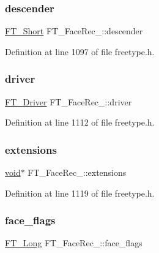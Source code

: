 \subsubsection{\texorpdfstring{descender}{descender}}
{\footnotesize\ttfamily \mbox{\hyperlink{fttypes_8h_aa7279be89046a2563cd3d4d6651fbdcf}{F\+T\+\_\+\+Short}} F\+T\+\_\+\+Face\+Rec\+\_\+\+::descender}



Definition at line 1097 of file freetype.\+h.

\mbox{\label{struct_f_t___face_rec___a011b62fcffdd6dc421c9ab3286d4c9fa}} 
\subsubsection{\texorpdfstring{driver}{driver}}
{\footnotesize\ttfamily \mbox{\hyperlink{freetype_8h_a5503c06c138ccdfeef486f2ce87bb8ec}{F\+T\+\_\+\+Driver}} F\+T\+\_\+\+Face\+Rec\+\_\+\+::driver}



Definition at line 1112 of file freetype.\+h.

\mbox{\label{struct_f_t___face_rec___a8b24f993e38da597d3e0273267890f49}} 
\subsubsection{\texorpdfstring{extensions}{extensions}}
{\footnotesize\ttfamily \mbox{\hyperlink{_s_d_l__opengles2__gl2ext_8h_ae5d8fa23ad07c48bb609509eae494c95}{void}}$\ast$ F\+T\+\_\+\+Face\+Rec\+\_\+\+::extensions}



Definition at line 1119 of file freetype.\+h.

\mbox{\label{struct_f_t___face_rec___af1596857ebc9f8eac4c4b51c8f3ffd31}} 
\subsubsection{\texorpdfstring{face\_flags}{face\_flags}}
{\footnotesize\ttfamily \mbox{\hyperlink{fttypes_8h_a7fa72a1f0e79fb1860c5965789024d6f}{F\+T\+\_\+\+Long}} F\+T\+\_\+\+Face\+Rec\+\_\+\+::face\+\_\+flags}



